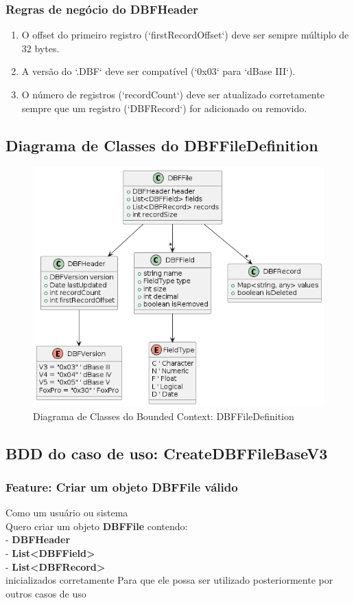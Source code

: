 \subsubsection{Regras de negócio do DBFHeader}
\begin{enumerate}
    \item O offset do primeiro registro (`firstRecordOffset`) deve ser sempre múltiplo de 32 bytes.
    \item A versão do `.DBF` deve ser compatível (`0x03` para `dBase III`).
    \item O número de registros (`recordCount`) deve ser atualizado corretamente sempre que um registro (`DBFRecord`) for adicionado ou removido.
\end{enumerate}


\subsection{Diagrama de Classes do DBFFileDefinition}
\begin{figure}[H]
    \centering
    \includegraphics[width=1\textwidth]{image/uml_DBFESTRUCTURE.png}
    \caption{Diagrama de Classes do Bounded Context: DBFFileDefinition}
\end{figure}

\subsection{BDD do caso de uso: CreateDBFFileBaseV3}
\subsubsection{Feature: Criar um objeto DBFFile válido}
Como um usuário ou sistema \\
Quero criar um objeto \textbf{DBFFile} contendo: \\
- \textbf{DBFHeader}\\
- \textbf{List<DBFField>} \\
- \textbf{List<DBFRecord>}\\
inicializados corretamente Para que ele possa ser utilizado posteriormente por outros casos de uso \\

